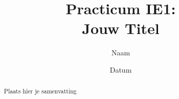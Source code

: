 \documentclass{report}
\title{Practicum IE1:\\ Jouw Titel}
\author{Naam }
\date{Datum}
\begin{document}
\maketitle

\newpage
\begin{abstract}
    Plaats hier je samenvatting
\end{abstract}








\end{document}
